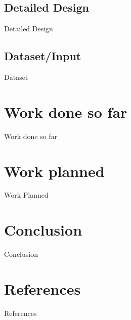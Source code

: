 \documentclass{beamer}
\begin{document}
\subsection{Detailed Design}
\begin{frame}{Detailed Design}
\end{frame}

\subsection{Dataset/Input}
\begin{frame}{Dataset}
\end{frame}


\section{Work done so far}
\begin{frame}{Work done so far}
\end{frame}


\section{Work planned}
\begin{frame}{Work Planned}
\end{frame}


\section{Conclusion}
\begin{frame}{Conclusion}
\end{frame}


\section{References}
\begin{frame}{References}
	\nocite{*}
	
	
\end{frame}

\end{document}
